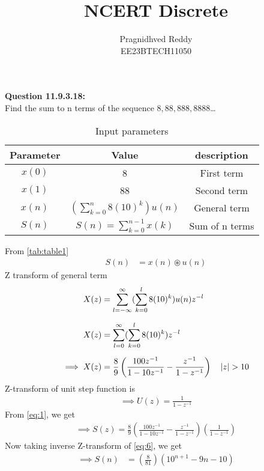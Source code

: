 \documentclass[journal,12pt,twocolumn]{IEEEtran}
\title{NCERT Discrete}
\author{Pragnidhved Reddy\\EE23BTECH11050}
\date{}
\begin{document}
\maketitle
\newpage
\bigskip
\textbf{Question 11.9.3.18:}\\
 Find the sum to n terms of the sequence $8,88,888,8888$\ldots\\
 \solution
\begin{table}[H]
\centering
\setlength{\extrarowheight}{8pt}
\begin{tabular}{|c|c|c|}\hline
\textbf{Parameter} & \textbf{Value} & \textbf{description}\\ \hline
$x(0)$ & 8 & First term \\ \hline
$x(1)$ & 88 & Second term \\ \hline 
$x(n)$ & $(\sum^{n}_{k=0}8(10)^k)u(n)$ & General term \\ \hline
$S(n)$ & $S(n)=\sum^{n-1}_{k=0}x(k)$ & Sum of n terms \\ \hline
\end{tabular}
\caption{Input parameters}
\label{tab:table1}
\end{table}
 From \eqref{tab:table1}
\begin{align}
\label{eq:1}
 S(n)&=x(n)\circledast u(n)
 \end{align}
 Z transform of general term
 \begin{align}
 X(z)&=\sum_{l=-\infty}^{\infty}(\sum_{k=0}^{l}8(10)^k)u(n)z^{-l}\\[6pt]
 X(z)&=\sum_{l=0}^{\infty}(\sum_{k=0}^{l}8(10)^k)z^{-l}\\[6pt]
 \implies X(z)&=\frac{8}{9}\left(\frac{100z^{-1}}{1-10z^{-1}}-\frac{z^{-1}}{1-z^{-1}}\right) \quad \left\vert z\right\vert>10
\end{align}
 Z-transform of unit step function is 
 \begin{align}
 \implies U(z)=\frac{1}{1-z^{-1}}
 \end{align}
From \eqref{eq:1}, we get
 \begin{align}
 \label{eq:6}
 \implies S(z)=\frac{8}{9}\left(\frac{100z^{-1}}{1-10z^{-1}}-\frac{z^{-1}}{1-z^{-1}}\right)\left(\frac{1}{1-z^{-1}}\right)
 \end{align}
 Now taking inverse Z-transform of \eqref{eq:6}, we get
 \begin{align}
\implies S(n)&=\left(\frac{8}{81}\right)(10^{n+1}-9n-10)   
 \end{align}
 
\end{document}
